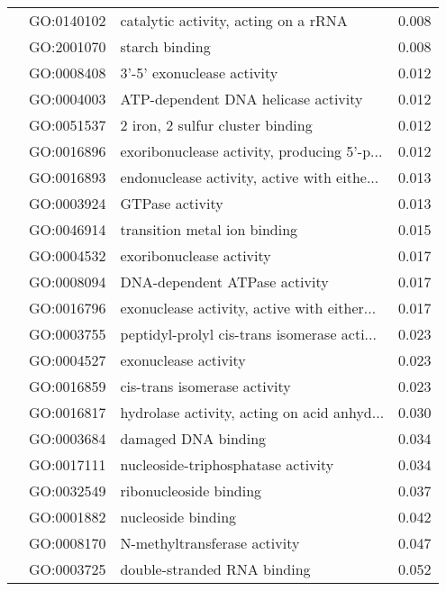 \begin{longtable}{lllr}
   & GO:0140102 &         catalytic activity, acting on a rRNA &         0.008 \\
   & GO:2001070 &                               starch binding &         0.008 \\
   & GO:0008408 &                   3'-5' exonuclease activity &         0.012 \\
   & GO:0004003 &          ATP-dependent DNA helicase activity &         0.012 \\
   & GO:0051537 &             2 iron, 2 sulfur cluster binding &         0.012 \\
   & GO:0016896 &  exoribonuclease activity, producing 5'-p... &         0.012 \\
   & GO:0016893 &  endonuclease activity, active with eithe... &         0.013 \\
   & GO:0003924 &                              GTPase activity &         0.013 \\
   & GO:0046914 &                 transition metal ion binding &         0.015 \\
   & GO:0004532 &                     exoribonuclease activity &         0.017 \\
   & GO:0008094 &                DNA-dependent ATPase activity &         0.017 \\
   & GO:0016796 &  exonuclease activity, active with either... &         0.017 \\
   & GO:0003755 &  peptidyl-prolyl cis-trans isomerase acti... &         0.023 \\
   & GO:0004527 &                         exonuclease activity &         0.023 \\
   & GO:0016859 &                 cis-trans isomerase activity &         0.023 \\
   & GO:0016817 &  hydrolase activity, acting on acid anhyd... &         0.030 \\
   & GO:0003684 &                          damaged DNA binding &         0.034 \\
   & GO:0017111 &           nucleoside-triphosphatase activity &         0.034 \\
   & GO:0032549 &                       ribonucleoside binding &         0.037 \\
   & GO:0001882 &                           nucleoside binding &         0.042 \\
   & GO:0008170 &                 N-methyltransferase activity &         0.047 \\
   & GO:0003725 &                  double-stranded RNA binding &         0.052 \\

\end{longtable}
